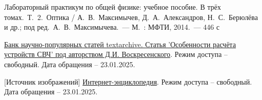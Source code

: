 \documentclass[a4paper, 14pt]{article}
\begin{document}
     {}
    \begin{thebibliography}{}
        
         Лабораторный практикум по общей физике: учебное пособие.
        В трёх томах.~Т.~2.~Оптика / А.~В.~Максимычев, Д.~А.~Александров, Н.~С.~Берюлёва и др.;
        под ред.~А.~В.~Максимычева.~— М.~: МФТИ, 2014.~— 446 с
        
         \href{https://textarchive.ru/c-2236776.html}{Банк научно-популярных статей textarchive.
        Статья 'Особенности расчёта устройств СВЧ' под авторством Д.И. Воскресенского}.
        Режим доступа -- свободный.
        Дата обращения -- 23.01.2025.
        
         [Источник изображений] \href{https://ru.wikipedia.org/wiki/Оптическое_волокно}
        {Интернет-энциклопедия}.
        Режим доступа -- свободный.
        Дата обращения -- 23.01.2025.
    
    \end{thebibliography}
\end{document}
